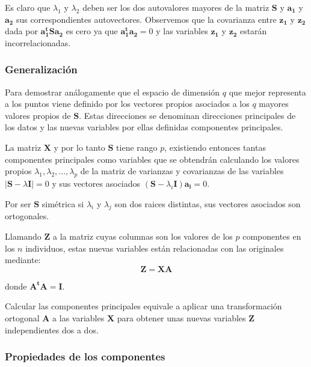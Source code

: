 \documentclass[12pt,letterpaper]{report} %
\begin{document}
Es claro que $\lambda_1$ y $\lambda_2$ deben ser los dos autovalores mayores de la matriz $\mathbf{S}$ y $\mathbf{a_1}$ y $\mathbf{a_2}$ sus correspondientes autovectores. Observemos que la covarianza entre $\mathbf{z_1}$ y $\mathbf{z_2}$ dada por $\mathbf{a_1^tSa_2}$ es cero ya que $\mathbf{a_1^ta_2}=0$ y las variables $\mathbf{z_1}$ y $\mathbf{z_2}$ estarán incorrelacionadas.

\subsubsection{Generalización}

Para demostrar análogamente que el espacio de dimensión $q$ que mejor representa a los puntos viene definido por los vectores propios asociados a los $q$ mayores valores propios de $\mathbf{S}$. Estas direcciones se denominan direcciones principales de los datos y las nuevas variables por ellas definidas componentes principales.

La matriz $\mathbf{X}$ y por lo tanto $\mathbf{S}$ tiene rango $p$, existiendo entonces tantas componentes principales como variables que se obtendrán calculando los valores propios $\lambda_1,\lambda_2,...,\lambda_p$ de la matriz de varianzas y covarianzas de las variables $|\mathbf{S}-\lambda \mathbf{I}|=0$ y sus vectores  asociados $(\mathbf{S}-\lambda_i \mathbf{I})\mathbf{a_i}=0$.

Por ser $\mathbf{S}$ simétrica si $\lambda_i$ y $\lambda_j$ son dos raices distintas, sus vectores asociados son ortogonales.

Llamando $\mathbf{Z}$ a la matriz cuyas columnas son los valores de los $p$ componentes en los $n$ individuos, estas nuevas variables están relacionadas con las originales mediante:
$$\mathbf{Z}=\mathbf{XA}$$

donde $\mathbf{A^tA}=\mathbf{I}$.

Calcular las componentes principales equivale a aplicar una transformación ortogonal $\mathbf{A}$ a las variables $\mathbf{X}$ para obtener unas nuevas variables $\mathbf{Z}$ independientes dos a dos.

\subsubsection{Propiedades de los componentes}
\end{document}
